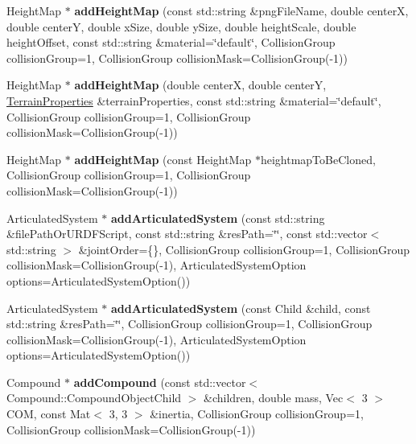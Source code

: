 \begin{DoxyCompactItemize}
Height\+Map $\ast$ {\bfseries add\+Height\+Map} (const std\+::string \&png\+File\+Name, double centerX, double centerY, double x\+Size, double y\+Size, double height\+Scale, double height\+Offset, const std\+::string \&material=\char`\"{}default\char`\"{}, Collision\+Group collision\+Group=1, Collision\+Group collision\+Mask=Collision\+Group(-\/1))
\item 
\mbox{\label{classraisim_1_1World_af56304fa322c9d96a1c1f76fa958ce41}} 
Height\+Map $\ast$ {\bfseries add\+Height\+Map} (double centerX, double centerY, \hyperlink{structraisim_1_1TerrainProperties}{Terrain\+Properties} \&terrain\+Properties, const std\+::string \&material=\char`\"{}default\char`\"{}, Collision\+Group collision\+Group=1, Collision\+Group collision\+Mask=Collision\+Group(-\/1))
\item 
\mbox{\label{classraisim_1_1World_aad0185cdaa6fe2e107b2a589db5d654a}} 
Height\+Map $\ast$ {\bfseries add\+Height\+Map} (const Height\+Map $\ast$heightmap\+To\+Be\+Cloned, Collision\+Group collision\+Group=1, Collision\+Group collision\+Mask=Collision\+Group(-\/1))
\item 
\mbox{\label{classraisim_1_1World_aa3b8b8a955dd44d2b210e322a0f83d36}} 
Articulated\+System $\ast$ {\bfseries add\+Articulated\+System} (const std\+::string \&file\+Path\+Or\+U\+R\+D\+F\+Script, const std\+::string \&res\+Path=\char`\"{}\char`\"{}, const std\+::vector$<$ std\+::string $>$ \&joint\+Order=\{\}, Collision\+Group collision\+Group=1, Collision\+Group collision\+Mask=Collision\+Group(-\/1), Articulated\+System\+Option options=Articulated\+System\+Option())
\item 
\mbox{\label{classraisim_1_1World_a864be7f4ce49174ae9fc23af2a7a3a40}} 
Articulated\+System $\ast$ {\bfseries add\+Articulated\+System} (const Child \&child, const std\+::string \&res\+Path=\char`\"{}\char`\"{}, Collision\+Group collision\+Group=1, Collision\+Group collision\+Mask=Collision\+Group(-\/1), Articulated\+System\+Option options=Articulated\+System\+Option())
\item 
\mbox{\label{classraisim_1_1World_a7275dda52216469a4d2e172673a28761}} 
Compound $\ast$ {\bfseries add\+Compound} (const std\+::vector$<$ Compound\+::\+Compound\+Object\+Child $>$ \&children, double mass, Vec$<$ 3 $>$ C\+OM, const Mat$<$ 3, 3 $>$ \&inertia, Collision\+Group collision\+Group=1, Collision\+Group collision\+Mask=Collision\+Group(-\/1))

\end{DoxyCompactItemize}
